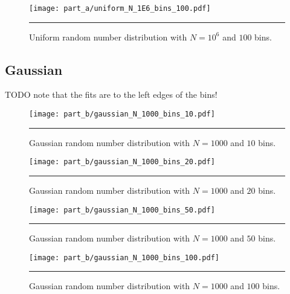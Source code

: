 \documentclass[notitlepage,aps,prd,nofootinbib]{revtex4-1}
\begin{document}
\begin{figure}[!htbc]
  \centering
  \texttt{[image: part\_a/uniform\_N\_1E6\_bins\_100.pdf]}
	{\par\nobreak\rule[9pt]{35em}{0.5pt}\vspace{-5mm}}
	\caption{Uniform random number distribution with $N = 10^6$ and $100$ bins.}
	\label{fig:uniform_N_1E6_bins_100}
\end{figure}



\clearpage
\subsection{Gaussian}
\label{subsec:gaussian_results}
TODO
note that the fits are to the left edges of the bins!

\begin{figure}[!htbc]
  \centering
  \texttt{[image: part\_b/gaussian\_N\_1000\_bins\_10.pdf]}
	{\par\nobreak\rule[9pt]{35em}{0.5pt}\vspace{-5mm}}
	\caption{Gaussian random number distribution with $N = 1000$ and $10$ bins.}
	\label{fig:gaussian_N_1000_bins_10}
\end{figure}

\begin{figure}[!htbc]
  \centering
  \texttt{[image: part\_b/gaussian\_N\_1000\_bins\_20.pdf]}
	{\par\nobreak\rule[9pt]{35em}{0.5pt}\vspace{-5mm}}
	\caption{Gaussian random number distribution with $N = 1000$ and $20$ bins.}
	\label{fig:gaussian_N_1000_bins_20}
\end{figure}

\begin{figure}[!htbc]
  \centering
  \texttt{[image: part\_b/gaussian\_N\_1000\_bins\_50.pdf]}
	{\par\nobreak\rule[9pt]{35em}{0.5pt}\vspace{-5mm}}
	\caption{Gaussian random number distribution with $N = 1000$ and $50$ bins.}
	\label{fig:gaussian_N_1000_bins_50}
\end{figure}

\begin{figure}[!htbc]
  \centering
  \texttt{[image: part\_b/gaussian\_N\_1000\_bins\_100.pdf]}
	{\par\nobreak\rule[9pt]{35em}{0.5pt}\vspace{-5mm}}
	\caption{Gaussian random number distribution with $N = 1000$ and $100$ bins.}
	\label{fig:gaussian_N_1000_bins_100}
\end{figure}
\end{document}
